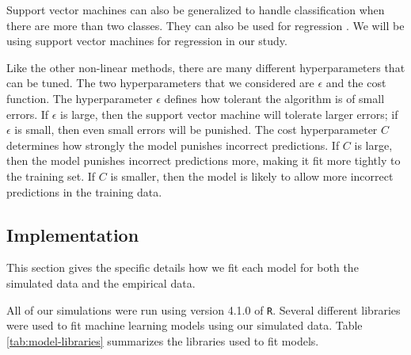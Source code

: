 \documentclass{article}
\begin{document}
Support vector machines can also be generalized to handle classification when there are more than two classes. They can also be used for regression \cite{drucker1997support}. We will be using support vector machines for regression in our study.

Like the other non-linear methods, there are many different hyperparameters that can be tuned. The two hyperparameters that we considered are $\epsilon$ and the cost function. The hyperparameter $\epsilon$ defines how tolerant the algorithm is of small errors. If $\epsilon$ is large, then the support vector machine will tolerate larger errors; if $\epsilon$ is small, then even small errors will be punished. The cost hyperparameter $C$ determines how strongly the model punishes incorrect predictions. If $C$ is large, then the model punishes incorrect predictions more, making it fit more tightly to the training set. If $C$ is smaller, then the model is likely to allow more incorrect predictions in the training data.


\subsection{Implementation}

This section gives the specific details how we fit each model for both the simulated data and the empirical data.

All of our simulations were run using version 4.1.0 of \lstinline!R!. Several different libraries were used to fit machine learning models using our simulated data. Table \ref{tab:model-libraries} summarizes the libraries used to fit models.
\end{document}
